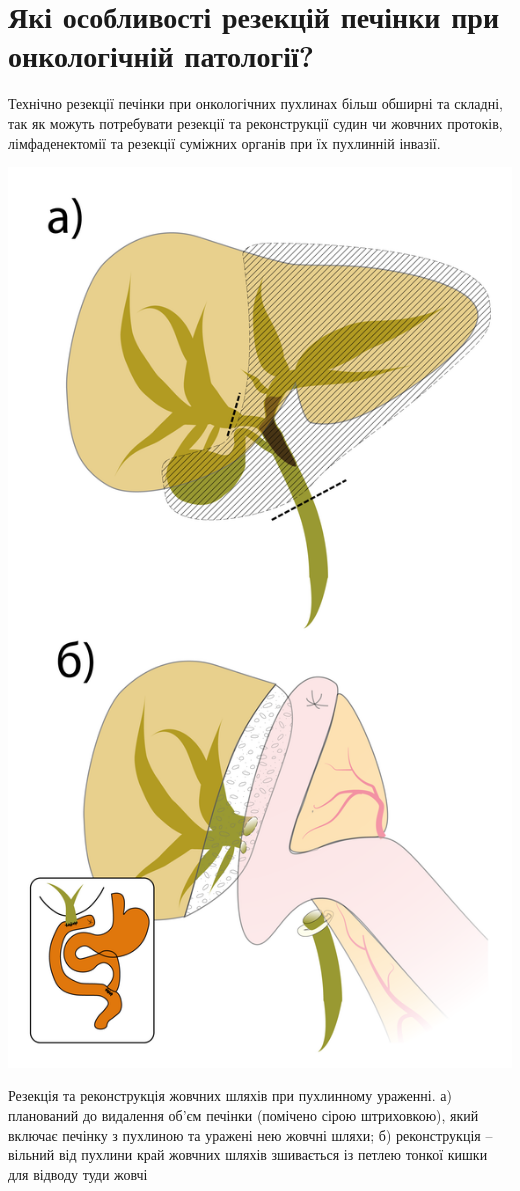 \section{Які особливості резекцій печінки при онкологічній патології?}

Технічно резекції печінки при онкологічних пухлинах більш обширні та складні, так як можуть потребувати резекції та реконструкції судин чи жовчних протоків, лімфаденектомії та резекції суміжних органів при їх пухлинній інвазії. 

\begin{marginfigure}%
  \includegraphics[width=\linewidth]{Figures/Bile duct resection.png}
  \caption{Резекція та реконструкція жовчних шляхів при пухлинному ураженні. 
  а) планований до видалення об'єм печінки (помічено сірою штриховкою), який включає печінку з пухлиною та уражені нею жовчні шляхи; б) реконструкція -- вільний від пухлини край жовчних шляхів зшивається із петлею тонкої кишки для відводу туди жовчі}
  \label{fig:crlm}
\end{marginfigure}

